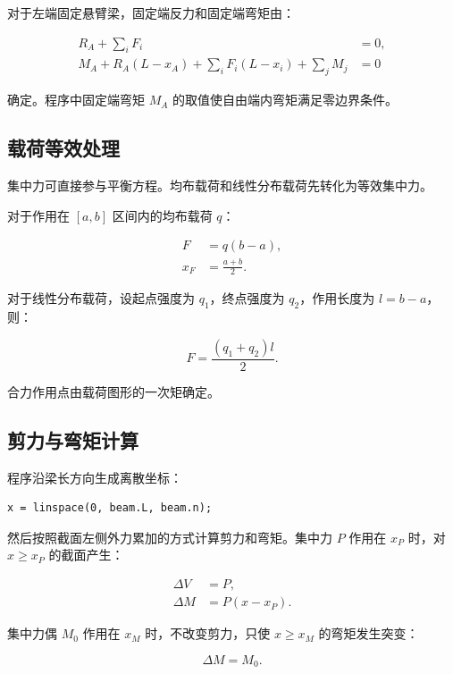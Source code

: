 \documentclass[UTF8,a4paper,12pt]{ctexart}
\numberwithin{equation}{section}
\begin{document}
对于左端固定悬臂梁，固定端反力和固定端弯矩由：

\begin{align}
R_A+\sum_i F_i &= 0,\\
M_A+R_A(L-x_A)+\sum_i F_i(L-x_i)+\sum_j M_j &= 0
\end{align}

确定。程序中固定端弯矩 $M_A$ 的取值使自由端内弯矩满足零边界条件。

\subsection{载荷等效处理}

集中力可直接参与平衡方程。均布载荷和线性分布载荷先转化为等效集中力。

对于作用在 $[a,b]$ 区间内的均布载荷 $q$：

\begin{align}
F &= q(b-a),\\
x_F &= \frac{a+b}{2}.
\end{align}

对于线性分布载荷，设起点强度为 $q_1$，终点强度为 $q_2$，作用长度为 $l=b-a$，则：

\begin{equation}
F=\frac{(q_1+q_2)l}{2}.
\end{equation}

合力作用点由载荷图形的一次矩确定。

\subsection{剪力与弯矩计算}

程序沿梁长方向生成离散坐标：

\begin{verbatim}
x = linspace(0, beam.L, beam.n);
\end{verbatim}

然后按照截面左侧外力累加的方式计算剪力和弯矩。集中力 $P$ 作用在 $x_P$ 时，对 $x\ge x_P$ 的截面产生：

\begin{align}
\Delta V &= P,\\
\Delta M &= P(x-x_P).
\end{align}

集中力偶 $M_0$ 作用在 $x_M$ 时，不改变剪力，只使 $x\ge x_M$ 的弯矩发生突变：

\begin{equation}
\Delta M=M_0.
\end{equation}
\end{document}
